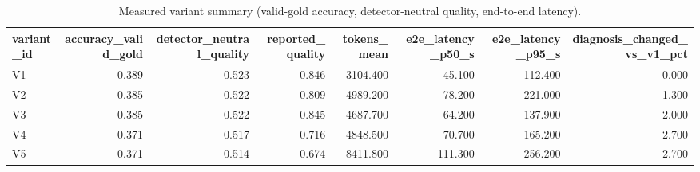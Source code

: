 \begin{table}[t]
\centering
\small
\begin{tabular}{lrrrrrrr}
\toprule
variant\_id & accuracy\_valid\_gold & detector\_neutral\_quality & reported\_quality & tokens\_mean & e2e\_latency\_p50\_s & e2e\_latency\_p95\_s & diagnosis\_changed\_vs\_v1\_pct \\
\midrule
V1 & 0.389 & 0.523 & 0.846 & 3104.400 & 45.100 & 112.400 & 0.000 \\
V2 & 0.385 & 0.522 & 0.809 & 4989.200 & 78.200 & 221.000 & 1.300 \\
V3 & 0.385 & 0.522 & 0.845 & 4687.700 & 64.200 & 137.900 & 2.000 \\
V4 & 0.371 & 0.517 & 0.716 & 4848.500 & 70.700 & 165.200 & 2.700 \\
V5 & 0.371 & 0.514 & 0.674 & 8411.800 & 111.300 & 256.200 & 2.700 \\
\bottomrule
\end{tabular}
\caption{Measured variant summary (valid-gold accuracy, detector-neutral quality, end-to-end latency).}
\label{tab:rigor_variants}
\end{table}
